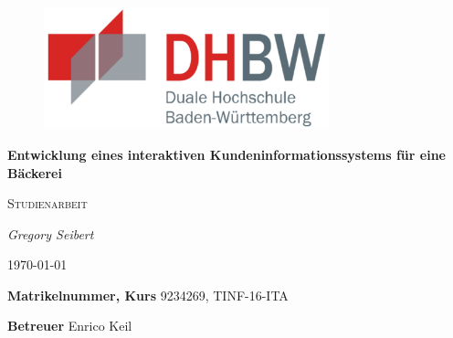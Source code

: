 \begin{titlepage}
	\centering

	\begin{figure}
		\centering
		\includegraphics[height=100pt]{images/dhbw.pdf}
	\end{figure}
	
	\vspace{2cm}
	
	{\huge\bfseries  Entwicklung eines interaktiven Kundeninformationssystems für eine Bäckerei\par}
	
	\vspace{0.5cm}
	
	{\scshape\Large Studienarbeit\par}
	
	\vspace{2cm}
	
	{\large\itshape Gregory Seibert\par}
	
	\vspace{1cm}
	
	{\large \today\par}
	
	\vfill
	
	\textbf{Matrikelnummer, Kurs} \hfill 9234269, TINF-16-ITA
	
	\textbf{Betreuer} \hfill Enrico Keil
	
\end{titlepage}